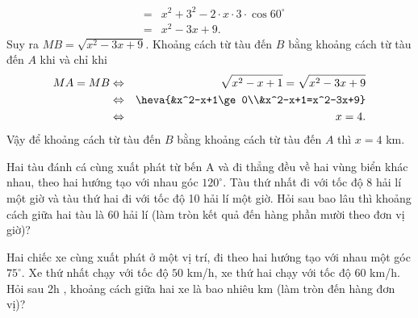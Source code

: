 \begin{ex}
{\begin{itemchoice}
\begin{eqnarray*}
				&=&x^2+3^2-2\cdot x\cdot  3\cdot \cos 60^\circ\\
				&=&x^2-3x+9. 
			\end{eqnarray*}
			Suy ra $MB=\sqrt{x^2-3x+9}$. 
			 \itemch Khoảng cách từ tàu đến $B$ bằng khoảng cách từ tàu đến $A$ khi và chỉ khi
			\allowdisplaybreaks 
			\begin{eqnarray*}
				 MA=MB&\Leftrightarrow&\sqrt{x^2-x+1}=\sqrt{x^2-3x+9}\\
				&\Leftrightarrow&\heva{&x^2-x+1\ge 0\\&x^2-x+1=x^2-3x+9}\\ 
				 &\Leftrightarrow&x=4.
			\end{eqnarray*}
			Vậy để khoảng cách  từ tàu đến $B$ bằng khoảng cách từ tàu đến $A$ thì $x=4$ km.
		\end{itemchoice}
	} 
\end{ex}


\begin{bt}%
	Hai tàu đánh cá cùng xuất phát từ bến A và đi thẳng đều về hai vùng biển khác nhau, theo hai hướng tạo với nhau góc $120^{\circ}$. Tàu thứ  nhất đi với tốc độ 8 hải lí một giờ và tàu thứ hai đi với tốc độ 10 hải lí một giờ. Hỏi sau bao lâu thì khoảng cách giữa hai tàu là 60 hải lí (làm tròn kết quả đến hàng phần mười theo đơn vị giờ)?
\end{bt}

\begin{bt}%
	Hai chiếc xe cùng  xuất phát ở một vị trí, đi theo hai hướng tạo với nhau một góc $75^\circ$. Xe thứ
	nhất chạy với tốc độ $50$ km/h, xe thứ hai chạy  với tốc độ $60$ km/h. Hỏi sau 2h , khoảng cách
	giữa hai xe là bao nhiêu km (làm tròn đến hàng đơn  vị)?
\end{bt}

